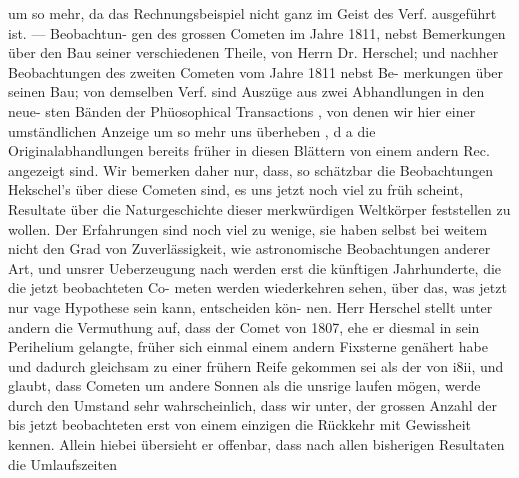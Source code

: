 \documentclass[12pt,a4paper]{article}
\begin{document}
um so mehr, da das Rechnungsbeispiel nicht ganz im Geist des Verf. ausgeführt ist. --- Beobachtun-\newline
gen des grossen Cometen im Jahre 1811, nebst Bemerkungen über den Bau seiner verschiedenen Theile,\newline
von Herrn Dr. Herschel; und nachher Beobachtungen des zweiten Cometen vom Jahre 1811 nebst Be-\newline
merkungen über seinen Bau; von demselben Verf. sind Auszüge aus zwei Abhandlungen in den neue-\newline
sten Bänden der Phüosophical Transactions , von denen wir hier einer umständlichen Anzeige um so\newline
mehr uns überheben , d a die Originalabhandlungen bereits früher in diesen Blättern von einem andern\newline
Rec. angezeigt sind. Wir bemerken daher nur, dass, so schätzbar die Beobachtungen Hekschel's über\newline
diese Cometen sind, es uns jetzt noch viel zu früh scheint, Resultate über die Naturgeschichte dieser\newline
merkwürdigen Weltkörper feststellen zu wollen. Der Erfahrungen sind noch viel zu wenige, sie haben\newline
selbst bei weitem nicht den Grad von Zuverlässigkeit, wie astronomische Beobachtungen anderer Art,\newline
und unsrer Ueberzeugung nach werden erst die künftigen Jahrhunderte, die die jetzt beobachteten Co-\newline
meten werden wiederkehren sehen, über das, was jetzt nur vage Hypothese sein kann, entscheiden kön-\newline
nen. Herr Herschel stellt unter andern die Vermuthung auf, dass der Comet von 1807, ehe er diesmal\newline
in sein Perihelium gelangte, früher sich einmal einem andern Fixsterne genähert habe und dadurch\newline
gleichsam zu einer frühern Reife gekommen sei als der von i8ii, und glaubt, dass Cometen um andere\newline
Sonnen als die unsrige laufen mögen, werde durch den Umstand sehr wahrscheinlich, dass wir unter,\newline
der grossen Anzahl der bis jetzt beobachteten erst von einem einzigen die Rückkehr mit Gewissheit\newline
kennen. Allein hiebei übersieht er offenbar, dass nach allen bisherigen Resultaten die Umlaufszeiten\newline
\end{document}
